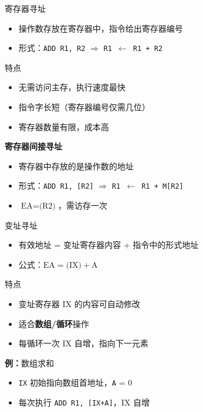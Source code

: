 \documentclass[10pt, aspectratio=169]{beamer}
\begin{document}
\begin{frame}{寄存器寻址}
    \begin{itemize}
        \item 操作数存放在寄存器中，指令给出寄存器编号
        \item 形式：\texttt{ADD R1, R2} $\Rightarrow$ \texttt{R1 $\leftarrow$ R1 + R2}
    \end{itemize}
    \vspace{0.3em}
    \begin{block}{特点}
        \begin{itemize}
            \item[+] 无需访问主存，执行速度最快
            \item[+] 指令字长短（寄存器编号仅需几位）
            \item[-] 寄存器数量有限，成本高
        \end{itemize}
    \end{block}
    \vspace{0.3em}
    \textbf{寄存器间接寻址}
    \begin{itemize}
        \item 寄存器中存放的是操作数的地址
        \item 形式：\texttt{ADD R1, [R2]} $\Rightarrow$ \texttt{R1 $\leftarrow$ R1 + M[R2]}
        \item $\text{EA} = \text{(R2)}$，需访存一次
    \end{itemize}
\end{frame}

\begin{frame}{变址寻址}
    \begin{itemize}
        \item 有效地址 = 变址寄存器内容 + 指令中的形式地址
        \item 公式：$\text{EA} = \text{(IX)} + \text{A}$
    \end{itemize}
    \vspace{0.3em}
    \begin{block}{特点}
        \begin{itemize}
            \item 变址寄存器 IX 的内容可自动修改
            \item 适合\textbf{数组/循环}操作
            \item 每循环一次 IX 自增，指向下一元素
        \end{itemize}
    \end{block}
    \vspace{0.3em}
    \textbf{例：}数组求和
    \begin{itemize}
        \item \texttt{IX} 初始指向数组首地址，\texttt{A} = 0
        \item 每次执行 \texttt{ADD R1, [IX+A]}，IX 自增
    \end{itemize}
\end{frame}
\end{document}
